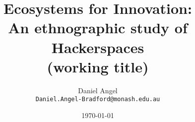 \documentclass[a4paper,11pt,notitlepage]{article}
\title{Ecosystems for Innovation: \\An ethnographic study of Hackerspaces\\\small{(working title)}}
\author{Daniel Angel\\\texttt{Daniel.Angel-Bradford@monash.edu.au}}
\date{\today} %
\begin{document}



\maketitle

\tableofcontents



\newpage








%




\small



%
\end{document}
